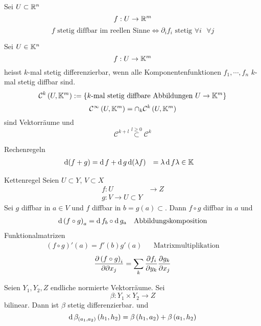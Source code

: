 \begin{Kor}
  Sei $U\subset\mathbb{R}^n$
  \[f:U\to\mathbb{R}^m\]
  \[\text{$f$ stetig diffbar im reellen Sinne}\iff\text{$\partial_if_i$ stetig $\forall i$ $\forall j$}\]
\end{Kor}
\begin{Def}
  Sei $U\in\mathbb{K}^n$
  \[f:U\to\mathbb{K}^m\]
  heisst $k$-mal stetig differenzierbar, wenn alle Komponentenfunktionen $f_1,\cdots,f_n$ $k$-mal stetig diffbar sind.
  \[\mathcal{C}^k\left( U,\mathbb{K}^m \right):=\left\{ \text{$k$-mal stetig diffbare Abbildungen $U\to\mathbb{K}^m$} \right\}\]
  \[\mathcal{C}^\infty\left( U,\mathbb{K}^m \right)=\cap_k\mathcal{C}^k\left( U,\mathbb{K}^m \right)\]
  sind Vektorräume und
  \[\mathcal{C}^{k+l}\stackrel{l\geq 0}{\subset}\mathcal{C}^k\]
\end{Def}
\begin{Bem}{Rechenregeln}
  \begin{align*}
    \operatorname{d}(f+g)&=\operatorname{d} f+\operatorname{d} g
    \operatorname{d}(\lambda f)&=\lambda \operatorname{d} f &\lambda\in \mathbb{K}
  \end{align*}
\end{Bem}
\begin{Bem}{Kettenregel}
  Seien $U\subset Y$, $V\subset X$
  \begin{align*}
    f:U&\to Z\\
    g:V\to U\subset Y
  \end{align*}
  Sei $g$ diffbar in $a\in V$ und $f$ diffbar in $b=g(a)\subset$. Dann $f\circ g$ diffbar in $a$ und
  \begin{align*}
    \operatorname{d}\left( f\circ g \right)_a=\operatorname{d} f_b\circ \operatorname{d} g_a&&\text{Abbildungskomposition}
  \end{align*}
  Funktionalmatrizen
  \begin{align*}
    \left( f\circ g \right)'(a)=f'(b)g'(a)&&\text{Matrixmultiplikation}
  \end{align*}
  \[\dfrac{\partial \left( f\circ g \right)_i}{\partial \partial x_j}=\sum_k\dfrac{\partial f_i}{\partial y_k}\dfrac{\partial g_k}{\partial x_j}\]
\end{Bem}
\begin{Lem}
  Seien $Y_1,Y_2,Z$ endliche normierte Vektorräume. Sei
  \[\beta:Y_1\times Y_2\to Z\]
  bilinear. Dann ist $\beta$ stetig differenzierbar. und
  \[\operatorname{d} \beta_{\left( a_1,a_2 \right)}\left( h_1,h_2 \right)=\beta\left( h_1,a_2 \right)+\beta\left( a_1,h_2 \right)\]
\end{Lem}
